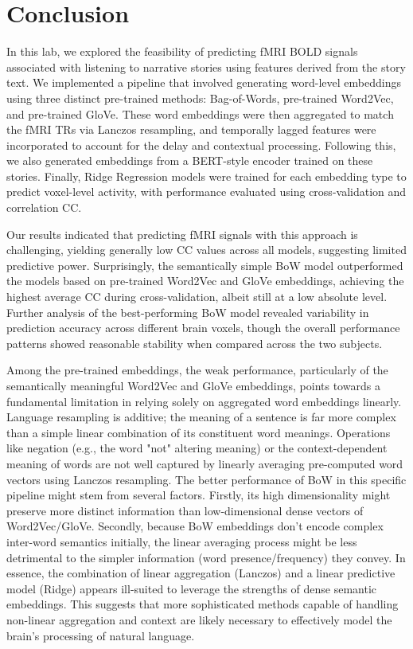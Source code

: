 \documentclass[10pt,letterpaper]{article}
\begin{document}
\section{Conclusion}
In this lab, we explored the feasibility of predicting fMRI BOLD signals associated with listening to narrative stories using features derived from the story text. We implemented a pipeline that involved generating word-level embeddings using three distinct pre-trained methods: Bag-of-Words, pre-trained Word2Vec, and pre-trained GloVe. These word embeddings were then aggregated to match the fMRI TRs via Lanczos resampling, and temporally lagged features were incorporated to account for the delay and contextual processing. Following this, we also generated embeddings from a BERT-style encoder trained on these stories. Finally, Ridge Regression models were trained for each embedding type to predict voxel-level activity, with performance evaluated using cross-validation and correlation CC.

Our results indicated that predicting fMRI signals with this approach is challenging, yielding generally low CC values across all models, suggesting limited predictive power. Surprisingly, the semantically simple BoW model outperformed the models based on pre-trained Word2Vec and GloVe embeddings, achieving the highest average CC during cross-validation, albeit still at a low absolute level. Further analysis of the best-performing BoW model revealed variability in prediction accuracy across different brain voxels, though the overall performance patterns showed reasonable stability when compared across the two subjects.

Among the pre-trained embeddings, the weak performance, particularly of the semantically meaningful Word2Vec and GloVe embeddings, points towards a fundamental limitation in relying solely on aggregated word embeddings linearly. Language resampling is additive; the meaning of a sentence is far more complex than a simple linear combination of its constituent word meanings. Operations like negation (e.g., the word "not" altering meaning) or the context-dependent meaning of words are not well captured by linearly averaging pre-computed word vectors using Lanczos resampling. The better performance of BoW in this specific pipeline might stem from several factors. Firstly, its high dimensionality might preserve more distinct information than low-dimensional dense vectors of Word2Vec/GloVe. Secondly, because BoW embeddings don't encode complex inter-word semantics initially, the linear averaging process might be less detrimental to the simpler information (word presence/frequency) they convey. In essence, the combination of linear aggregation (Lanczos) and a linear predictive model (Ridge) appears ill-suited to leverage the strengths of dense semantic embeddings. This suggests that more sophisticated methods capable of handling non-linear aggregation and context are likely necessary to effectively model the brain's processing of natural language.
\end{document}
